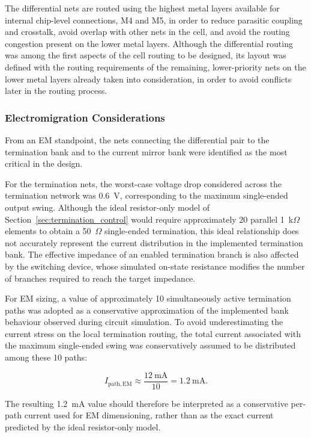 The differential nets are routed using the highest metal layers available for internal chip-level connections, \ac{M4} and \ac{M5}, in order to reduce parasitic coupling and crosstalk, avoid overlap with other nets in the cell, and avoid the routing congestion present on the lower metal layers. Although the differential routing was among the first aspects of the cell routing to be designed, its layout was defined with the routing requirements of the remaining, lower-priority nets on the lower metal layers already taken into consideration, in order to avoid conflicts later in the routing process.

\subsubsection{Electromigration Considerations}

From an \ac{EM} standpoint, the nets connecting the differential pair to the termination bank and to the current mirror bank were identified as the most critical in the design.

For the termination nets, the worst-case voltage drop considered across the termination network was 0.6~V, corresponding to the maximum single-ended output swing. Although the ideal resistor-only model of Section~\ref{sec:termination_control} would require approximately 20 parallel 1~k$\Omega$ elements to obtain a 50~$\Omega$ single-ended termination, this ideal relationship does not accurately represent the current distribution in the implemented termination bank. The effective impedance of an enabled termination branch is also affected by the switching device, whose simulated on-state resistance modifies the number of branches required to reach the target impedance.

For EM sizing, a value of approximately 10 simultaneously active termination paths was adopted as a conservative approximation of the implemented bank behaviour observed during circuit simulation. To avoid underestimating the current stress on the local termination routing, the total current associated with the maximum single-ended swing was conservatively assumed to be distributed among these 10 paths:

\begin{equation}
I_{\mathrm{path,EM}}
\approx
\frac{12~\mathrm{mA}}{10}
=
1.2~\mathrm{mA}.
\end{equation}

The resulting 1.2~mA value should therefore be interpreted as a conservative per-path current used for EM dimensioning, rather than as the exact current predicted by the ideal resistor-only model.

